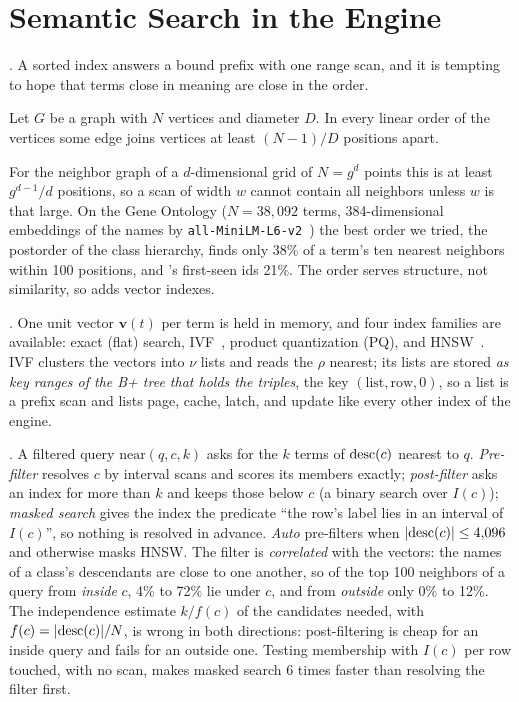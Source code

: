 \section{Semantic Search in the Engine}
\label{sec-sem}\label{sec-order}\label{sec-vectors}\label{sec-hybrid}

.
A sorted index answers a bound prefix with one range scan, and it is tempting
to hope that terms close in meaning are close in the order.
\begin{lemma}[Bandwidth]\label{lem-bw}
Let $G$ be a graph with $N$ vertices and diameter $D$.
In every linear order of the vertices some edge joins vertices at least
$(N-1)/D$ positions apart.
\end{lemma}
For the neighbor graph of a $d$-dimensional grid of $N=g^d$ points this is at
least $g^{d-1}/d$ positions, so a scan of width $w$ cannot contain all
neighbors unless $w$ is that large.
On the Gene Ontology ($N=38{,}092$ terms, 384-dimensional embeddings of the names
by \texttt{all-MiniLM-L6-v2}~\cite{reimers2019}) the best order we tried, the
postorder of the class hierarchy, finds only 38\% of a term's ten nearest
neighbors within 100 positions, and \sys's first-seen ids 21\%.
The order serves structure, not similarity, so \sys adds vector indexes.





.
One unit vector $\mathbf{v}(t)$ per term is held in memory, and four index
families are available: exact (flat) search, IVF~\cite{jegou2011}, product
quantization (PQ), and HNSW~\cite{malkov2020}.
IVF clusters the vectors into $\nu$ lists and reads the $\rho$ nearest; its
lists are stored \emph{as key ranges of the B+ tree that holds the triples}, the
key $(\mathrm{list},\mathrm{row},0)$, so a list is a prefix scan and lists
page, cache, latch, and update like every other index of the engine.

.
A filtered query $\mathrm{near}(q,c,k)$ asks for the $k$ terms of $\mathrm{desc}(c)$
nearest to $q$.
\emph{Pre-filter} resolves $c$ by interval scans and scores its members
exactly; \emph{post-filter} asks an index for more than $k$ and keeps those
below $c$ (a binary search over $I(c)$); \emph{masked search} gives the index
the predicate ``the row's label lies in an interval of $I(c)$'', so nothing is
resolved in advance.
\emph{Auto} pre-filters when $|\mathrm{desc}(c)|\le 4{,}096$ and otherwise masks HNSW.
The filter is \emph{correlated} with the vectors: the names of a class's
descendants are close to one another, so of the top 100 neighbors of a query from
\emph{inside} $c$, 4\% to 72\% lie under $c$, and from \emph{outside} only 0\% to
12\%.
The independence estimate $k/f(c)$ of the candidates needed, with
$f(c)=|\mathrm{desc}(c)|/N$, is wrong in both directions: post-filtering is cheap for an
inside query and fails for an outside one.
Testing membership with $I(c)$ per row touched, with no scan, makes masked
search 6 times faster than resolving the filter first.
